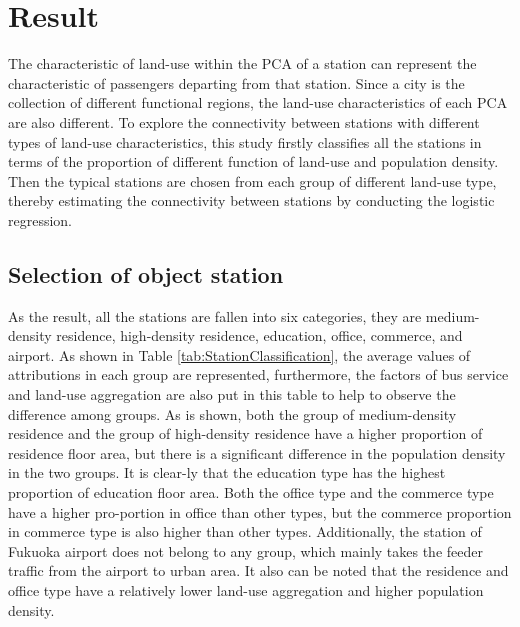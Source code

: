 \documentclass[utf8]{article}
\begin{document}
\section{Result}
\indent

%
The characteristic of land-use within the PCA of a station can represent the characteristic of passengers departing from that station. Since a city is the collection of different functional regions, the land-use characteristics of each PCA are also different. To explore the connectivity between stations with different types of land-use characteristics, this study firstly classifies all the stations in terms of the proportion of different function of land-use and population density. Then the typical stations are chosen from each group of different land-use type, thereby estimating the connectivity between stations by conducting the logistic regression. 

\subsection{Selection of object station}
\indent

%
As the result, all the stations are fallen into six categories, they are medium-density residence, high-density residence, education, office, commerce, and airport. As shown in Table \ref{tab:StationClassification}, the average values of attributions in each group are represented, furthermore, the factors of bus service and land-use aggregation are also put in this table to help to observe the difference among groups. As is shown, both the group of medium-density residence and the group of high-density residence have a higher proportion of residence floor area, but there is a significant difference in the population density in the two groups. It is clear-ly that the education type has the highest proportion of education floor area. Both the office type and the commerce type have a higher pro-portion in office than other types, but the commerce proportion in commerce type is also higher than other types. Additionally, the station of Fukuoka airport does not belong to any group, which mainly takes the feeder traffic from the airport to urban area. It also can be noted that the residence and office type have a relatively lower land-use aggregation and higher population density.
\end{document}
